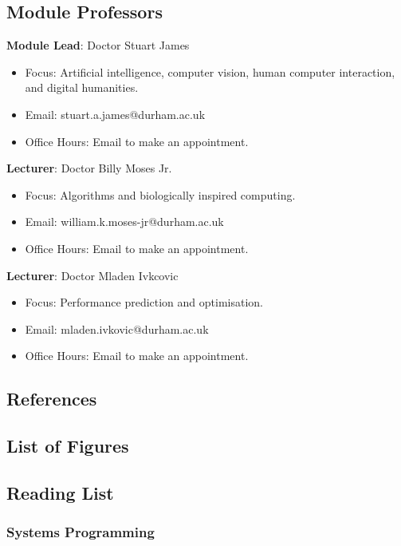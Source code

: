 \subsection{Module Professors}

\textbf{Module Lead}: Doctor Stuart James

\begin{itemize}\label{modulelead-stuartjames}
    \item Focus: Artificial intelligence, computer vision, human computer interaction, and digital humanities.
    \item Email: stuart.a.james@durham.ac.uk
    \item Office Hours: Email to make an appointment.
\end{itemize}

\textbf{Lecturer}: Doctor Billy Moses Jr.

\begin{itemize}\label{lecturer-billymoses}
    \item Focus: Algorithms and biologically inspired computing.
    \item Email: william.k.moses-jr@durham.ac.uk
    \item Office Hours: Email to make an appointment.
\end{itemize}

\textbf{Lecturer}: Doctor Mladen Ivkcovic

\begin{itemize}\label{lecturer-mladenivkovic}
    \item Focus: Performance prediction and optimisation.
    \item Email: mladen.ivkovic@durham.ac.uk
    \item Office Hours: Email to make an appointment.
\end{itemize}

\subsection{References}

\subsection{List of Figures}

\subsection{Reading List}

\subsubsection{Systems Programming}

